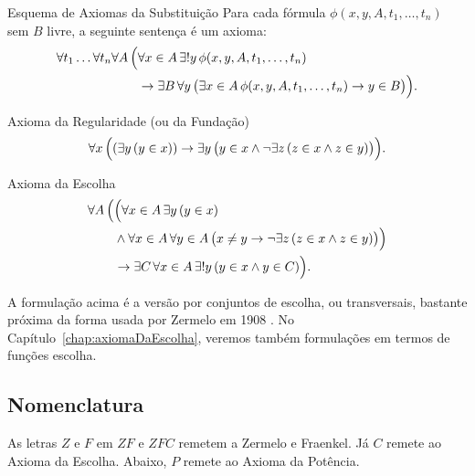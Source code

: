 \begin{displayaxiom}{Esquema de Axiomas da Substituição}
    Para cada fórmula $\phi(x, y, A, t_1, \ldots, t_n)$ sem $B$ livre, a seguinte sentença é um axioma:
    \[
        \begin{aligned}
            \forall t_1 \ldots \forall t_n \forall A\, \Bigl(
                &\forall x \in A\, \exists! y\, \phi(x, y, A, t_1, \ldots, t_n) \\
                &\rightarrow \exists B\, \forall y\, \bigl(\exists x \in A\, \phi(x, y, A, t_1, \ldots, t_n) \rightarrow y \in B\bigr)
            \Bigr).
        \end{aligned}
    \]
\end{displayaxiom}

\begin{displayaxiom}{Axioma da Regularidade (ou da Fundação)}
    \[
        \forall x\, \Bigl((\exists y\, (y \in x)) \rightarrow \exists y\, \bigl(y \in x \land \neg \exists z\, (z \in x \land z \in y)\bigr)\Bigr).
    \]
\end{displayaxiom}

\begin{displayaxiom}{Axioma da Escolha}
    \[
        \begin{aligned}
            \forall A\, \Bigl(
                &\Bigl(
                    \forall x \in A\, \exists y\, (y \in x) \\
                    &\land \forall x \in A\, \forall y \in A\, \bigl(x \neq y \rightarrow \neg \exists z\, (z \in x \land z \in y)\bigr)
                \Bigr) \\
                &\rightarrow \exists C\, \forall x \in A\, \exists! y\, (y \in x \land y \in C)
            \Bigr).
        \end{aligned}
    \]
\end{displayaxiom}

A formulação acima é a versão por conjuntos de escolha, ou transversais, bastante próxima da forma usada por Zermelo em 1908 \cite{zermelo1908untersuchungen}.
No Capítulo~\ref{chap:axiomaDaEscolha}, veremos também formulações em termos de funções escolha.

\subsection{Nomenclatura}
    As letras $Z$ e $F$ em $ZF$ e $ZFC$ remetem a Zermelo e Fraenkel.
    Já $C$ remete ao Axioma da Escolha.
    Abaixo, $P$ remete ao Axioma da Potência.

